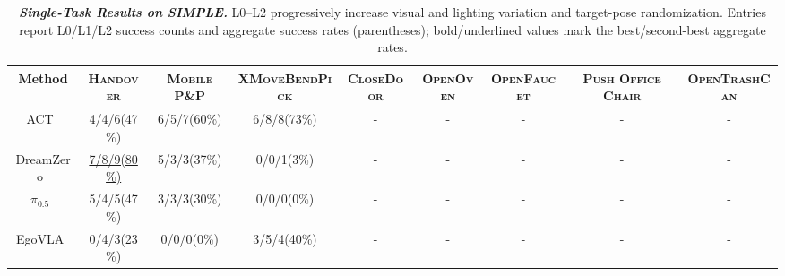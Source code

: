 \begin{table}[H]
  \caption{\textbf{\textit{Single-Task Results on SIMPLE.}} L0--L2 progressively increase visual and lighting variation and target-pose randomization. Entries report L0/L1/L2 success counts and aggregate success rates (parentheses); bold/underlined values mark the best/second-best aggregate rates.}
  \label{table:simple_main_results}
  \centering
  \setlength{\tabcolsep}{0pt}
  \renewcommand{\arraystretch}{1.08}
  \fontsize{6.2}{7}\selectfont
  \newcommand{\taskheader}[1]{{\fontsize{5.55}{6.2}\selectfont\textbf{\textsc{\hspace{2.2pt}#1\hspace{2.2pt}}}}}
  \newcommand{\resultentry}[2]{{\fontsize{5.2}{6}\selectfont\hspace{2.2pt}#1\;(#2)\hspace{2.2pt}}}
  \newcommand{\bestentry}[2]{{\fontsize{5.2}{6}\selectfont\textbf{\hspace{2.2pt}#1\;(#2)\hspace{2.2pt}}}}
  \newcommand{\secondentry}[2]{{\fontsize{5.2}{6}\selectfont\hspace{2.2pt}\underline{#1\;(#2)}\hspace{2.2pt}}}

  \begin{adjustbox}{width=\textwidth}
  \begin{tabular}{@{}c*{8}{c}@{}}
    \toprule
    {\fontsize{5.55}{6.2}\selectfont\textbf{Method}}
    & \taskheader{Handover}
    & \taskheader{Mobile P\&P}
    & \taskheader{XMoveBendPick}
    & \taskheader{CloseDoor}
    & \taskheader{OpenOven}
    & \taskheader{OpenFaucet}
    & \taskheader{Push Office Chair}
    & \taskheader{OpenTrashCan} \\
    \midrule

    ACT~\cite{ACT}
    & \resultentry{4/4/6}{47\%}
    & \secondentry{6/5/7}{60\%}
    & \resultentry{6/8/8}{73\%}
    & - & - & - & - & - \\

    DreamZero~\cite{dreamzero}
    & \secondentry{7/8/9}{80\%}
    & \resultentry{5/3/3}{37\%}
    & \resultentry{0/0/1}{3\%}
    & - & - & - & - & - \\

    $\pi_{0.5}$~\cite{pi05}
    & \resultentry{5/4/5}{47\%}
    & \resultentry{3/3/3}{30\%}
    & \resultentry{0/0/0}{0\%}
    & - & - & - & - & - \\

    EgoVLA~\cite{egovla}
    & \resultentry{0/4/3}{23\%}
    & \resultentry{0/0/0}{0\%}
    & \resultentry{3/5/4}{40\%}
    & - & - & - & - & - \\


\end{tabular}
\end{adjustbox}
\end{table}
